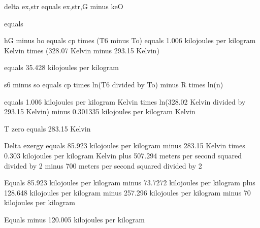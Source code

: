 delta ex,str equals ex,str,G minus keO

equals

hG minus ho equals cp times (T6 minus To) equals 1.006 kilojoules per kilogram Kelvin times (328.07 Kelvin minus 293.15 Kelvin)

equals 35.428 kilojoules per kilogram

s6 minus so equals cp times ln(T6 divided by To) minus R times ln(n)

equals 1.006 kilojoules per kilogram Kelvin times ln(328.02 Kelvin divided by 293.15 Kelvin) minus 0.301335 kilojoules per kilogram Kelvin

T zero equals 283.15 Kelvin  

Delta exergy equals 85.923 kilojoules per kilogram minus 283.15 Kelvin times 0.303 kilojoules per kilogram Kelvin plus 507.294 meters per second squared divided by 2 minus 700 meters per second squared divided by 2  

Equals 85.923 kilojoules per kilogram minus 73.7272 kilojoules per kilogram plus 128.648 kilojoules per kilogram minus 257.296 kilojoules per kilogram minus 70 kilojoules per kilogram  

Equals minus 120.005 kilojoules per kilogram